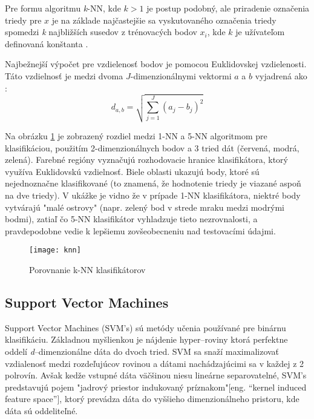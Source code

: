 Pre formu algoritmu \textit{k}-NN, kde $k > 1$ je postup podobný, ale priradenie označenia triedy pre $x$ je na základe najčastejšie sa vyskutovaného označenia triedy
spomedzi \textit{k} najbližších susedov z trénovacých bodov $x_i$, kde $k$ je užívateľom definovaná konštanta \cite{prop:KnnClassification}.

Najbežnejší výpočet pre vzdielenosť bodov je pomocou Euklidovskej vzdielenosti.
Táto vzdielnosť je medzi dvoma $J$-dimenzionálnymi vektormi $a$ a $b$ vyjadrená ako \cite{prop:KnnClassification}:
\begin{equation}
    \label{eq:euclidMetric}
    d_{a,b} = \sqrt{\sum_{j=1}^{J}{(a_j - b_j)^2}}
\end{equation}

Na obrázku \ref{pic:kNN} je zobrazený rozdiel medzi 1-NN a 5-NN algoritmom pre klasifikáciou,
    použitím 2-dimenzionálnych bodov a 3 tried dát (červená, modrá, zelená).
Farebné regióny vyznačujú rozhodovacie hranice klasifikátora, ktorý využíva Euklidovskú vzdielnosť.
Biele oblasti ukazujú body, ktoré sú nejednoznačne klasifikované (to znamená, že hodnotenie triedy je viazané aspoň na dve triedy).
V ukážke je vidno že v prípade 1-NN klasifikátora, niektré body vytvárajú "malé ostrovy"
    (napr. zelený bod v strede mraku medzi modrými bodmi), zatiaľ čo 5-NN klasifikátor vyhladzuje tieto nezrovnalosti,
    a pravdepodobne vedie k lepšiemu zovšeobecneniu nad testovacími údajmi.

\begin{figure}[H]
	\centering
	\texttt{[image: knn]}
	\caption{Porovnanie k-NN klasifikátorov\cite{odkaz:KnnImage}}
	\label{pic:kNN}
\end{figure}

\subsection{Support Vector Machines}

Support Vector Machines (SVM's) sú metódy učenia používané pre binárnu klasifikáciu.
Základnou myšlienkou je nájdenie hyper--roviny ktorá perfektne oddelí \textit{d}--dimenzionálne dáta do dvoch tried\cite{prop:IntroductionToSVM}.
SVM sa snaží maximalizovať vzdialenosť medzi rozdeľujúcov rovinou a dátami nachádzajúcimi sa v každej z 2 polrovín\cite{prop:SupervisedMachineLearning}.
Avšak kedže vstupné dáta väčšinou niesu lineárne separovatelné, SVM's predstavujú pojem "jadrový priestor indukovaný príznakom"[eng. “kernel induced feature space”],
    ktorý prevádza dáta do vyššieho dimenzionálneho pristoru, kde dáta sú oddeliteľné.\cite{prop:IntroductionToSVM}

